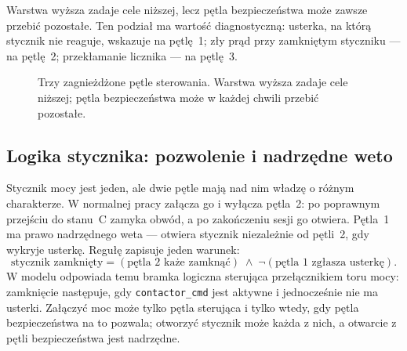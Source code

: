 \documentclass[11pt]{article}
\begin{document}
Warstwa wyższa zadaje cele niższej, lecz pętla bezpieczeństwa może zawsze przebić pozostałe. Ten podział ma wartość diagnostyczną: usterka, na którą stycznik nie reaguje, wskazuje na pętlę~1; zły prąd przy zamkniętym styczniku --- na pętlę~2; przekłamanie licznika --- na pętlę~3.

\begin{figure}[h]
\centering
{}
\caption{Trzy zagnieżdżone pętle sterowania. Warstwa wyższa zadaje cele niższej; pętla bezpieczeństwa może w każdej chwili przebić pozostałe.}
\label{rys:petle}
\end{figure}

\subsection{Logika stycznika: pozwolenie i nadrzędne weto}\label{sec:contactor}

Stycznik mocy jest jeden, ale dwie pętle mają nad nim władzę o różnym charakterze. W normalnej pracy załącza go i wyłącza pętla~2: po poprawnym przejściu do stanu~C zamyka obwód, a po zakończeniu sesji go otwiera. Pętla~1 ma prawo nadrzędnego weta --- otwiera stycznik niezależnie od pętli~2, gdy wykryje usterkę. Regułę zapisuje jeden warunek:
\[
\text{stycznik zamknięty} = (\text{pętla 2 każe zamknąć}) \;\wedge\; \lnot(\text{pętla 1 zgłasza usterkę}).
\]
W modelu odpowiada temu bramka logiczna sterująca przełącznikiem toru mocy: zamknięcie następuje, gdy \texttt{contactor\_cmd} jest aktywne i jednocześnie nie ma usterki. Załączyć moc może tylko pętla sterująca i tylko wtedy, gdy pętla bezpieczeństwa na to pozwala; otworzyć stycznik może każda z nich, a otwarcie z pętli bezpieczeństwa jest nadrzędne.
\end{document}

